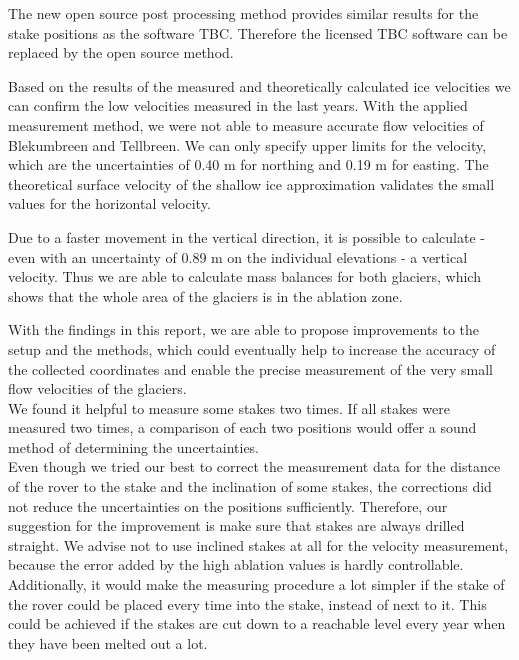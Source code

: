 The new open source post processing method provides similar results for the stake positions as the software TBC.
Therefore the licensed TBC software can be replaced by the open source method.
\medskip

Based on the results of the measured and theoretically calculated ice velocities we can confirm the low velocities
measured in the last years.
With the applied measurement method, we were not able to measure accurate flow velocities of Blekumbreen and Tellbreen.
We can only specify upper limits for the velocity, which are
the uncertainties of 0.40 m for northing and 0.19 m for easting.
The theoretical surface velocity of the shallow ice approximation validates the small values for the horizontal velocity.
\medskip

Due to a faster movement in the vertical direction, it is possible to calculate
- even with an uncertainty of 0.89 m on the individual elevations -
a vertical velocity.
Thus we are able to calculate mass balances for both glaciers,
which shows that the whole area of the glaciers is in the ablation zone.
\medskip

With the findings in this report,
we are able to propose improvements to the setup and the methods,
which could eventually help to increase the accuracy of the collected coordinates and
enable the precise measurement of the very small flow velocities of the glaciers.\\
We found it helpful to measure some stakes two times.
If all stakes were measured two times,
a comparison of each two positions would offer a sound method of determining the uncertainties.\\
Even though we tried our best to correct the measurement data for the distance
of the rover to the stake and the inclination of some stakes,
the corrections did not reduce the uncertainties on the positions sufficiently.
Therefore, our suggestion for the improvement is make sure that stakes are always drilled straight.
We advise not to use inclined stakes at all for the velocity measurement,
because the error added by the high ablation values is hardly controllable.
Additionally, it would make the measuring procedure a lot simpler if the stake of the rover could be placed every time
into the stake, instead of next to it.
This could be achieved if the stakes are cut down to a reachable level every year when they have been melted out a lot.\\







